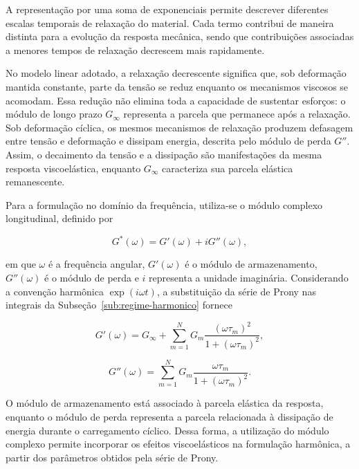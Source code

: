 \documentclass[arial,centeredequations,english,brazilian,oneside,section=TITLE]{ifes8}
\begin{document}
A representação por uma soma de exponenciais permite descrever
diferentes escalas temporais de relaxação do material. Cada termo
contribui de maneira distinta para a evolução da resposta mecânica,
sendo que contribuições associadas a menores tempos de relaxação
decrescem mais rapidamente.

No modelo linear adotado, a relaxação decrescente significa que, sob deformação
mantida constante, parte da tensão se reduz enquanto os mecanismos viscosos se
acomodam. Essa redução não elimina toda a capacidade de sustentar esforços:
o módulo de longo prazo $G_{\infty}$ representa a parcela que permanece após a
relaxação. Sob deformação cíclica, os mesmos mecanismos de relaxação produzem
defasagem entre tensão e deformação e dissipam energia, descrita pelo módulo de
perda $G''$. Assim, o decaimento da tensão e a dissipação são manifestações da
mesma resposta viscoelástica, enquanto $G_{\infty}$ caracteriza sua parcela
elástica remanescente.

Para a formulação no domínio da frequência, utiliza-se o módulo
complexo longitudinal, definido por

\begin{equation}
  G^*(\omega) = G'(\omega) + iG''(\omega),
  \label{eq:modulo-complexo}
\end{equation}

em que $\omega$ é a frequência angular, $G'(\omega)$ é o módulo de
armazenamento, $G''(\omega)$ é o módulo de perda e $i$ representa a
unidade imaginária. Considerando a convenção harmônica
$\exp(i\omega t)$, a substituição da série de Prony nas integrais da
Subseção~\ref{sub:regime-harmonico} fornece

\begin{equation}
  G'(\omega) =
  G_{\infty} +
  \sum_{m=1}^{N}
  G_m
  \frac{(\omega\tau_m)^2}
  {1+(\omega\tau_m)^2},
  \label{eq:modulo-armazenamento}
\end{equation}

\begin{equation}
  G''(\omega) =
  \sum_{m=1}^{N}
  G_m
  \frac{\omega\tau_m}
  {1+(\omega\tau_m)^2}.
  \label{eq:modulo-perda}
\end{equation}

O módulo de armazenamento está associado à parcela elástica da
resposta, enquanto o módulo de perda representa a parcela relacionada
à dissipação de energia durante o carregamento cíclico. Dessa forma,
a utilização do módulo complexo permite incorporar os efeitos
viscoelásticos na formulação harmônica, a partir dos parâmetros
obtidos pela série de Prony.
\end{document}
